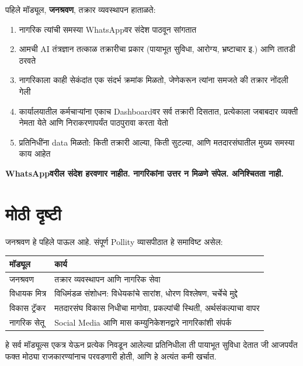 \documentclass[11pt, a4paper]{article}
\begin{document}
\vspace{0.8em}

पहिले मॉड्यूल, \textbf{जनश्रवण}, तक्रार व्यवस्थापन हाताळते:

\begin{enumerate}[leftmargin=1.5em, itemsep=4pt]
  \item नागरिक त्यांची समस्या \textenglish{WhatsApp}वर संदेश पाठवून सांगतात
  \item आमची \textenglish{AI} तंत्रज्ञान तत्काळ तक्रारीचा प्रकार (पायाभूत सुविधा, आरोग्य, भ्रष्टाचार इ.) आणि तातडी ठरवते
  \item नागरिकाला काही सेकंदांत एक संदर्भ क्रमांक मिळतो, जेणेकरून त्यांना समजते की तक्रार नोंदली गेली
  \item कार्यालयातील कर्मचाऱ्यांना एकाच \textenglish{Dashboard}वर सर्व तक्रारी दिसतात, प्रत्येकाला जबाबदार व्यक्ती नेमता येते आणि निराकरणापर्यंत पाठपुरावा करता येतो
  \item प्रतिनिधींना \textenglish{data} मिळतो: किती तक्रारी आल्या, किती सुटल्या, आणि मतदारसंघातील मुख्य समस्या काय आहेत
\end{enumerate}

\vspace{0.5em}

\textbf{\textenglish{WhatsApp}वरील संदेश हरवणार नाहीत. नागरिकांना उत्तर न मिळणे संपेल. अनिश्चितता नाही.}

\section{मोठी दृष्टी}

जनश्रवण हे पहिले पाऊल आहे. संपूर्ण \textenglish{Pollity} व्यासपीठात हे समाविष्ट असेल:

\begin{tabularx}{\linewidth}{lX}
\toprule
\textbf{मॉड्यूल} & \textbf{कार्य} \\
\midrule
जनश्रवण      & तक्रार व्यवस्थापन आणि नागरिक सेवा \\
विधायक मित्र & विधिमंडळ संशोधन: विधेयकांचे सारांश, धोरण विश्लेषण, चर्चेचे मुद्दे \\
विकास ट्रॅकर & मतदारसंघ विकास निधीचा मागोवा, प्रकल्पांची स्थिती, अर्थसंकल्पाचा वापर \\
नागरिक सेतू  & \textenglish{Social Media} आणि मास कम्युनिकेशनद्वारे नागरिकांशी संपर्क \\
\bottomrule
\end{tabularx}

\vspace{0.5em}
हे सर्व मॉड्यूल्स एकत्र येऊन प्रत्येक निवडून आलेल्या प्रतिनिधीला ती पायाभूत सुविधा देतात जी आजपर्यंत फक्त मोठ्या राजकारण्यांनाच परवडणारी होती, आणि हे अत्यंत कमी खर्चात.
\end{document}
